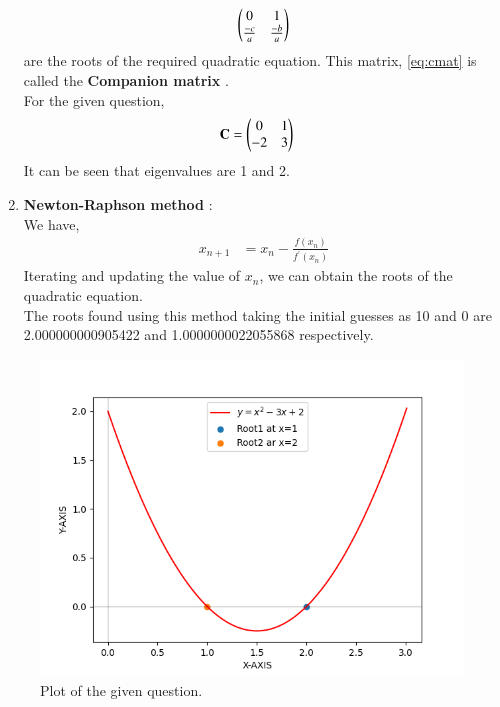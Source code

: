 \documentclass[journal]{IEEEtran}
\begin{document}
\begin{enumerate}
\begin{align}
		\begin{pmatrix}0 & 1 \\ \frac{-c}{a} & \frac{-b}{a}\end{pmatrix} \label{eq:cmat}
	\end{align}
	are the roots of the required quadratic equation. This matrix, \eqref{eq:cmat} is called the \textbf{Companion matrix} . \\
	For the given question, 
	\begin{align}
		\mathbf{C} &= \begin{pmatrix}0 & 1 \\ -2 & 3\end{pmatrix}
	\end{align}
	It can be seen that eigenvalues are 1 and 2.
	\item \textbf{Newton-Raphson method} : \\
		We have, 
		\begin{align}
			x_{n+1} &= x_{n} - \frac{f(x_{n})}{f^{\prime}(x_{n})}	
		\end{align}
		Iterating and updating the value of $x_{n}$, we can obtain the roots of the quadratic equation. \\
		The roots found using this method taking the initial guesses as 10 and 0 are 2.000000000905422 and 1.0000000022055868
 respectively.
\end{enumerate}
\begin{figure}[h]
\centering
\includegraphics[width=\columnwidth]{figs/fig.png}
\caption{Plot of the given question.}
\label{fig:Plot1} 
\end{figure}
\end{document}
